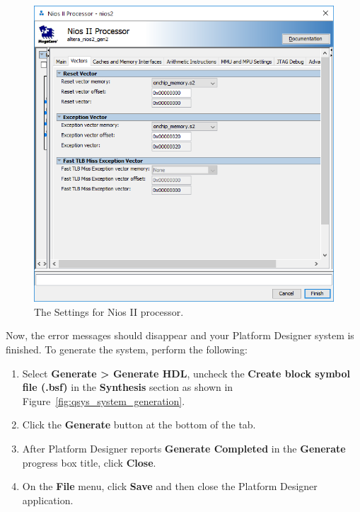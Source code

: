 \documentclass[11pt, twoside, pdftex]{article}
\begin{document}
\begin{figure}[H]
	\centering
	\includegraphics[scale=0.55]{figures/nios2_settings.png}
	\caption{The Settings for Nios II processor.} 
	\label{fig:nios2_settings}
\end{figure}

Now, the error messages should disappear and your Platform Designer system is finished. To generate the system, perform the following:

\begin{enumerate}
	\item Select {\bf Generate > Generate HDL}, uncheck the {\bf Create block symbol file (.bsf)} in the {\bf Synthesis} section as shown in Figure~\ref{fig:qsys_system_generation}.
	\item Click the {\bf Generate} button at the bottom of the tab.
	\item After Platform Designer reports {\bf Generate Completed} in the {\bf Generate} progress box title, click {\bf Close}.
	\item On the {\bf File} menu, click {\bf Save} and then close the Platform Designer application.
\end{enumerate}
\end{document}
